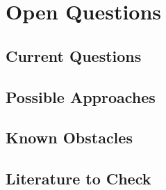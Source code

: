 \section{Open Questions}

\subsection{Current Questions}

\subsection{Possible Approaches}

\subsection{Known Obstacles}

\subsection{Literature to Check}
